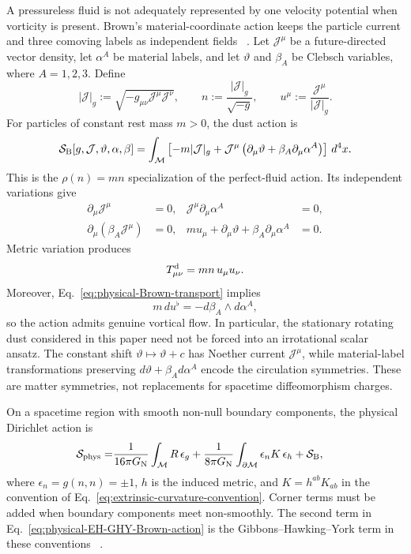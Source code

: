 A pressureless fluid is not adequately represented by one velocity
potential when vorticity is present. Brown's material-coordinate action
keeps the particle current and three comoving labels as independent fields
~\cite{Brown1993CQG}. Let $\mathcal J^\mu$ be a future-directed vector density,
let $\alpha^A$ be material labels, and let $\vartheta$ and $\beta_A$ be
Clebsch variables, where $A=1,2,3$. Define
\begin{equation}
 |\mathcal J|_g:=
 \sqrt{-g_{\mu\nu}\mathcal J^\mu\mathcal J^\nu},
 \qquad
 n:=\frac{|\mathcal J|_g}{\sqrt{-g}},
 \qquad
 u^\mu:=\frac{\mathcal J^\mu}{|\mathcal J|_g}.
 \label{eq:physical-Brown-variables}
\end{equation}
For particles of constant rest mass $m>0$, the dust action is
\begin{equation}
 \mathcal S_{\rm B}[g,\mathcal J,\vartheta,\alpha,\beta]
 =\int_{\mathcal M}
 \left[-m|\mathcal J|_g
 +\mathcal J^\mu
 \left(\partial_\mu\vartheta
 +\beta_A\partial_\mu\alpha^A\right)\right]\,d^4x.
 \label{eq:physical-Brown-action}
\end{equation}
This is the $\rho(n)=mn$ specialization of the perfect-fluid action. Its
independent variations give
\begin{align}
\partial_\mu\mathcal J^\mu&=0,
&
\mathcal J^\mu\partial_\mu\alpha^A&=0,
 \nonumber\\
\partial_\mu(\beta_A\mathcal J^\mu)&=0,
&
m u_\mu+\partial_\mu\vartheta
+\beta_A\partial_\mu\alpha^A&=0.
 \label{eq:physical-Brown-transport}
\end{align}
Metric variation produces
\begin{equation}
 T^{\rm d}_{\mu\nu}=mn\,u_\mu u_\nu.
 \label{eq:physical-Brown-stress}
\end{equation}
Moreover, Eq.~\eqref{eq:physical-Brown-transport} implies
\begin{equation}
 m\,d u^\flat=-d\beta_A\wedge d\alpha^A,
 \label{eq:physical-Brown-vorticity}
\end{equation}
so the action admits genuine vortical flow. In particular, the stationary
rotating dust considered in this paper need not be forced into an
irrotational scalar ansatz.
The constant shift $\vartheta\mapsto\vartheta+c$ has Noether current
$\mathcal J^\mu$, while material-label transformations preserving
$d\vartheta+\beta_A d\alpha^A$ encode the circulation symmetries. These are
matter symmetries, not replacements for spacetime diffeomorphism charges.

On a spacetime region with smooth non-null boundary components, the
physical Dirichlet action is
\begin{align}
 \mathcal S_{\rm phys}
 =&\frac{1}{16\pi G_{\rm N}}
 \int_{\mathcal M}R\,\epsilon_g
 +\frac{1}{8\pi G_{\rm N}}
 \int_{\partial\mathcal M}\epsilon_n K\,\epsilon_h
 +\mathcal S_{\rm B},
 \label{eq:physical-EH-GHY-Brown-action}
\end{align}
where $\epsilon_n=g(n,n)=\pm1$, $h$ is the induced metric, and
$K=h^{ab}K_{ab}$ in the convention of
Eq.~\eqref{eq:extrinsic-curvature-convention}. Corner terms must be added
when boundary components meet non-smoothly. The second term in
Eq.~\eqref{eq:physical-EH-GHY-Brown-action} is the
Gibbons--Hawking--York term in these conventions
~\cite{GibbonsHawking1977PRD}.


